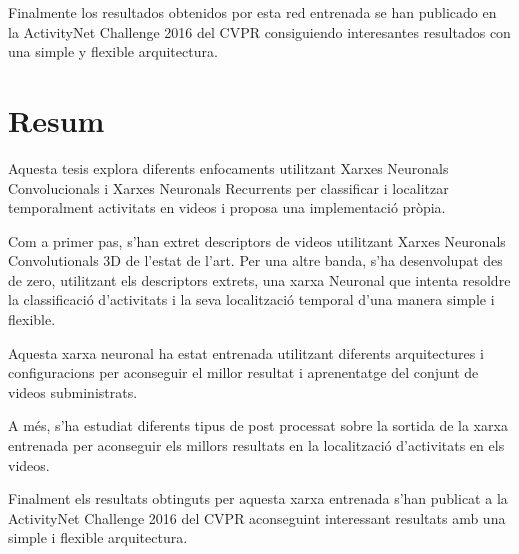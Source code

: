 Finalmente los resultados obtenidos por esta red entrenada se han publicado en la ActivityNet Challenge 2016 del CVPR consiguiendo interesantes resultados con una simple y flexible arquitectura.

\chapter*{Resum}

Aquesta tesis explora diferents enfocaments utilitzant Xarxes Neuronals Convolucionals i Xarxes Neuronals Recurrents per classificar i localitzar temporalment activitats en videos i proposa una implementació pròpia.

Com a primer pas, s'han extret descriptors de videos utilitzant Xarxes Neuronals Convolutionals 3D de l'estat de l'art. Per una altre banda, s'ha desenvolupat des de zero, utilitzant els descriptors extrets, una xarxa Neuronal que intenta resoldre la classificació d'activitats i la seva localització temporal d'una manera simple i flexible.

Aquesta xarxa neuronal ha estat entrenada utilitzant diferents arquitectures i configuracions per aconseguir el millor resultat i aprenentatge del conjunt de videos subministrats.

A més, s'ha estudiat diferents tipus de post processat sobre la sortida de la xarxa entrenada per aconseguir els millors resultats en la localització d'activitats en els videos.

Finalment els resultats obtinguts per aquesta xarxa entrenada s'han publicat a la ActivityNet Challenge 2016 del CVPR aconseguint interessant resultats amb una simple i flexible arquitectura.
